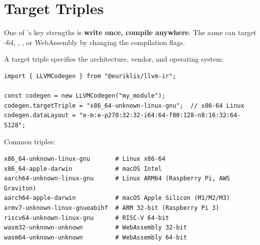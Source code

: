 \section{Target Triples}

One of  's key strengths is \textbf{write once, compile anywhere}. The same  can target -64, , , or WebAssembly by changing the compilation flags.

A target triple specifies the architecture, vendor, and operating system:

\begin{lstlisting}[style=ts]
import { LLVMCodegen } from "@euriklis/llvm-ir";

const codegen = new LLVMCodegen("my_module");
codegen.targetTriple = "x86_64-unknown-linux-gnu";  // x86-64 Linux
codegen.dataLayout = "e-m:e-p270:32:32-i64:64-f80:128-n8:16:32:64-S128";
\end{lstlisting}

Common triples:
\begin{lstlisting}[style=ir]
x86_64-unknown-linux-gnu       # Linux x86-64
x86_64-apple-darwin            # macOS Intel
aarch64-unknown-linux-gnu      # Linux ARM64 (Raspberry Pi, AWS Graviton)
aarch64-apple-darwin           # macOS Apple Silicon (M1/M2/M3)
armv7-unknown-linux-gnueabihf  # ARM 32-bit (Raspberry Pi 3)
riscv64-unknown-linux-gnu      # RISC-V 64-bit
wasm32-unknown-unknown         # WebAssembly 32-bit
wasm64-unknown-unknown         # WebAssembly 64-bit
\end{lstlisting}

